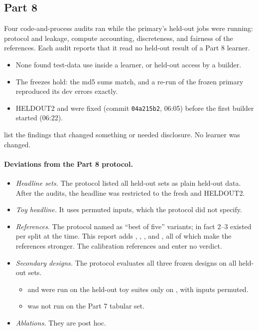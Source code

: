 \subsection{Part 8}

Four code-and-process audits ran while the primary's held-out jobs were running: protocol and leakage, compute accounting, discreteness, and fairness of the references. Each audit reports that it read no held-out result of a Part 8 learner.
\begin{itemize}
\item None found test-data use inside a learner, or held-out access by a builder.
\item The freezes hold: the md5 sums match, and a re-run of the frozen primary reproduced its dev errors exactly.
\item HELDOUT2 and  were fixed (commit \texttt{04a215b2}, 06:05) before the first builder started (06:22).
\end{itemize}
 list the findings that changed something or needed disclosure. No learner was changed.



\paragraph{Deviations from the Part 8 protocol.}
\begin{itemize}
\item \emph{Headline sets.} The protocol listed all held-out sets as plain held-out data. After the audits, the headline was restricted to the fresh  and HELDOUT2.
\item \emph{Toy headline.} It uses permuted inputs, which the protocol did not specify.
\item \emph{References.} The protocol named  as ``best of five'' variants; in fact 2--3 existed per split at the time. This report adds , , ,  and , all of which make the references stronger. The calibration references  and  enter no verdict.
\item \emph{Secondary designs.} The protocol evaluates all three frozen designs on all held-out sets.
  \begin{itemize}
  \item {} and  were run on the held-out toy suites only on , with inputs permuted.
  \item {} was not run on the Part 7 tabular set.
  \end{itemize}
\item \emph{Ablations.} They are post hoc.
\end{itemize}

